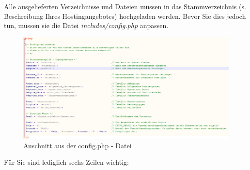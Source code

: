 \documentclass[fontsize = 12pt, paper = a4]{scrreprt}
\begin{document}
Alle ausgelieferten Verzeichnisse und Dateien müssen in das Stammverzeichnis (s. Beschreibung Ihres Hostingangebotes) hochgeladen werden. Bevor Sie dies jedoch tun, müssen sie die Datei \textit{includes/config.php} anpassen. \\ 

\begin{figure}[h]
\centering
\includegraphics[scale = 0.50]{website_config}
\caption[Auschnitt aus der config.php - Datei]{Auschnitt aus der config.php - Datei}
\label{websiteconfig}
\end{figure} 

\newpage

Für Sie sind lediglich sechs Zeilen wichtig: 
\end{document}
